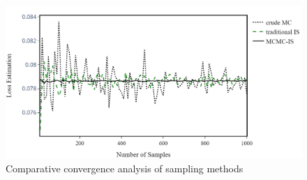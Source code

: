     \begin{figure}[H]
        \centering
        \includegraphics[scale=0.5]{Figures/Images/Illustrative Example/convergence_rate.png}
        \caption{Comparative convergence analysis of sampling methods}
        \label{fig:convergence_rate}
    \end{figure}